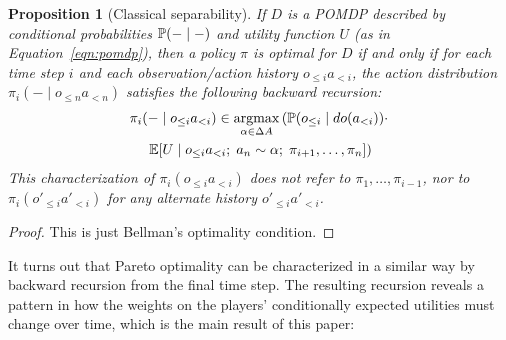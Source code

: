 \documentclass{article}
\newcommand{\hist}[1]{o_{\le #1}a_{<#1}}
\newcommand{\althist}[1]{o'_{\le #1}a'_{<#1}}
\newcommand{\dohist}[1]{o_{\le #1} \mid do(a_{<#1})}
\newcommand{\eqn}[1]{Equation~\ref{eqn:#1}}
\DeclareMathOperator*{\argmax}{argmax}
\newtheorem{proposition}[theorem]{Proposition}
\begin{document}
\begin{proposition}[Classical separability]\label{prop:separability}
If $D$ is a POMDP described by conditional probabilities $\mathbb{P}(-\mid -)$ and utility function $U$ (as in \eqn{pomdp}), then a policy $\pi$ is optimal for $D$ if and only if for each time step $i$ and each observation/action history $\hist{i}$, the action distribution $\pi_i(-\mid \hist{n})$ satisfies the following backward recursion:
\begin{multline*}
 \pi_i(-\mid\hist{i}) \in \argmax_{\alpha\in\Delta A}\left( \PP(\dohist{i})\cdot \right. \\ \left.\EE[U \mid \hist{i} ;\; a_n\sim \alpha; \; \pi_{i+1},\ldots,\pi_{n}] \right)
\end{multline*}
This characterization of $\pi_i(\hist{i})$ does not refer to $\pi_1,\ldots,\pi_{i-1}$, nor to 
$\pi_i(\althist{i})$ for any alternate history $\althist{i}$.
\end{proposition}

\begin{proof}
This is just Bellman's optimality condition.
\end{proof}

It turns out that Pareto optimality can be characterized in a similar way by backward recursion from the final time step.  The resulting recursion reveals a pattern in how the weights on the players' conditionally expected utilities must change over time, which is the main result of this paper:
\end{document}
